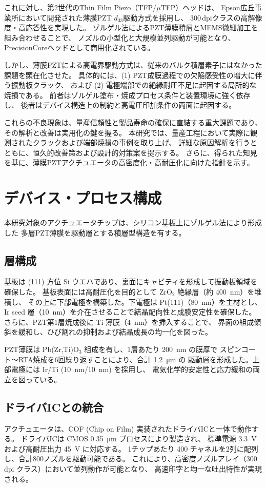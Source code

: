 \documentclass[conference]{IEEEtran}
\begin{document}
これに対し、第2世代のThin Film Piezo（TFP/$\mu$TFP）ヘッドは、
Epson広丘事業所において開発された薄膜PZT $d_{33}$駆動方式を採用し、
300\,dpiクラスの高解像度・高応答性を実現した。
ゾルゲル法によるPZT薄膜積層とMEMS微細加工を組み合わせることで、
ノズルの小型化と大規模並列駆動が可能となり、
PrecisionCoreヘッドとして商用化されている。

しかし、薄膜PZTによる高電界駆動方式は、従来のバルク積層素子にはなかった課題を顕在化させた。
具体的には、(1) PZT成膜過程での欠陥感受性の増大に伴う振動板クラック、
および (2) 電極端部での絶縁耐圧不足に起因する局所的な焼損である。
前者はゾルゲル塗布・焼成プロセス条件と装置環境に強く依存し、
後者はデバイス構造上の制約と高電圧印加条件の両面に起因する。

これらの不良現象は、量産信頼性と製品寿命の確保に直結する重大課題であり、
その解析と改善は実用化の鍵を握る。
本研究では、量産工程において実際に観測されたクラックおよび端部焼損の事例を取り上げ、
詳細な原因解析を行うとともに、恒久的改善策および設計的対策案を提示する。
さらに、得られた知見を基に、薄膜PZTアクチュエータの高密度化・高耐圧化に向けた指針を示す。

\section{デバイス・プロセス構成}
本研究対象のアクチュエータチップは、シリコン基板上にゾルゲル法により形成した
多層PZT薄膜を駆動層とする積層型構造を有する。

\subsection{層構成}
基板は (111) 方位 Si ウエハであり、裏面にキャビティを形成して振動板領域を確保した。
基板表面には高耐圧化を目的として ZrO$_2$ 絶縁層（約 \SI{400}{nm}）を堆積し、
その上に下部電極を構築した。下電極は Pt(111)（\SI{80}{nm}）を主材とし、
Ir seed 層（\SI{10}{nm}）を介在させることで結晶配向性と成膜安定性を確保した。
さらに、PZT第1層焼成後に Ti 薄膜（\SI{4}{nm}）を挿入することで、
界面の組成傾斜を緩和し、ひび割れの抑制および結晶成長の均一化を図った。

PZT薄膜は Pb(Zr,Ti)O$_3$ 組成を有し、1層あたり \SI{200}{nm} の膜厚で
スピンコート～RTA焼成を6回繰り返すことにより、合計 \SI{1.2}{\micro\metre} の
駆動層を形成した。上部電極には Ir/Ti (\SI{10}{nm}/\SI{10}{nm}) を採用し、
電気化学的安定性と応力緩和の両立を図っている。

\subsection{ドライバICとの統合}
アクチュエータは、COF (Chip on Film) 実装されたドライバICと一体で動作する。
ドライバICは CMOS \SI{0.35}{\micro\metre} プロセスにより製造され、
標準電源 \SI{3.3}{V} および高耐圧出力 \SI{45}{V} に対応する。
1チップあたり 400 チャネルを2列に配列し、合計800ノズルを駆動可能である。
これにより、高密度ノズルアレイ（300\,dpi クラス）において並列動作が可能となり、
高速印字と均一な吐出特性が実現される。
\end{document}
